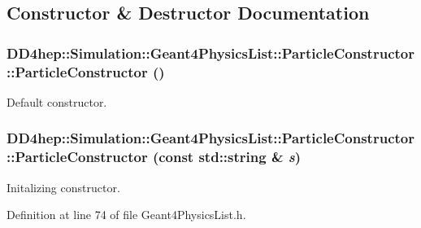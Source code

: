 \subsection{Constructor \& Destructor Documentation}
\hypertarget{class_d_d4hep_1_1_simulation_1_1_geant4_physics_list_1_1_particle_constructor_adba2d247dfc7585c62125d5f4284e8c0}{
\subsubsection[{ParticleConstructor}]{\setlength{\rightskip}{0pt plus 5cm}DD4hep::Simulation::Geant4PhysicsList::ParticleConstructor::ParticleConstructor ()}}
\label{class_d_d4hep_1_1_simulation_1_1_geant4_physics_list_1_1_particle_constructor_adba2d247dfc7585c62125d5f4284e8c0}


Default constructor. \hypertarget{class_d_d4hep_1_1_simulation_1_1_geant4_physics_list_1_1_particle_constructor_a3c4a6b9ead0cd6c10487c07c3376931d}{
\subsubsection[{ParticleConstructor}]{\setlength{\rightskip}{0pt plus 5cm}DD4hep::Simulation::Geant4PhysicsList::ParticleConstructor::ParticleConstructor (const std::string \& {\em s})}}
\label{class_d_d4hep_1_1_simulation_1_1_geant4_physics_list_1_1_particle_constructor_a3c4a6b9ead0cd6c10487c07c3376931d}


Initalizing constructor. 

Definition at line 74 of file Geant4PhysicsList.h.

